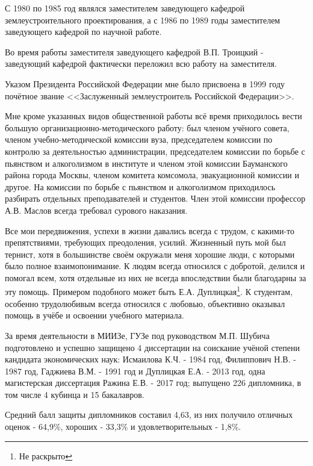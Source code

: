 С 1980 по 1985 год являлся заместителем заведующего кафедрой землеустроительного проектирования, а с 1986 по 1989 годы заместителем заведующего кафедрой по научной работе.

Во время работы заместителя заведующего кафедрой В.П. Троицкий - заведующий кафедрой фактически переложил всю работу на заместителя.

Указом Президента Российской Федерации мне было присвоена в 1999 году почётное звание <<Заслуженный землеустроитель Российской Федерации>>. 

Мне кроме указанных видов общественной работы всё время приходилось вести большую организационно-методического работу: был членом учёного совета, членом учебно-методической комиссии вуза, председателем комиссии по контролю за деятельностью администрации, председателем комиссии по борьбе с пьянством и алкоголизмом в институте и членом этой комиссии Бауманского района города Москвы, членом комитета комсомола, эвакуационной комиссии и другое. На комиссии по борьбе с пьянством и алкоголизмом приходилось разбирать отдельных преподавателей и студентов. Член этой комиссии профессор А.В. Маслов всегда требовал сурового наказания.

Все мои передвижения, успехи в жизни давались всегда с трудом, с какими-то препятствиями, требующих преодоления, усилий. Жизненный путь мой был тернист, хотя в большинстве своём окружали меня хорошие люди, с которыми было полное взаимопонимание. К людям всегда относился с добротой, делился и помогал всем, хотя отдельные из них не всегда впоследствии были благодарны за эту помощь. Примером подобного может быть Е.А. Дуплицкая\footnote{Не раскрыто}. К студентам, особенно трудолюбивым всегда относился с любовью, объективно оказывал помощь в учёбе и освоении учебного материала.

За время деятельности в МИИЗе, ГУЗе под руководством М.П. Шубича подготовлено и успешно защищено 4 диссертации на соискание учёной степени кандидата экономических наук: Исмаилова К.Ч. - 1984 год, Филиппович Н.В. - 1987 год, Гаджиева В.М. - 1991 год и Дуплицкая Е.А. - 2013 год, одна магистерская диссертация Ражина Е.В. - 2017 год; выпущено 226 дипломника, в том числе 4 кубинца и 15 бакалавров.

Средний балл защиты дипломников составил 4,63, из них получило отличных оценок - 64,9\%, хороших - 33,3\% и удовлетворительных - 1,8\%.

